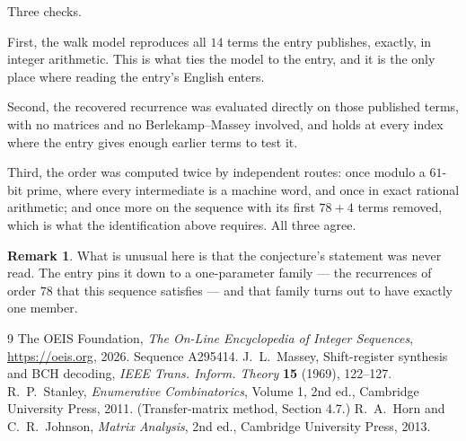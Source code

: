 \documentclass[11pt,a4paper]{article}
\theoremstyle{plain}
\theoremstyle{definition}
\newtheorem{remark}[theorem]{Remark}
\begin{document}
Three checks.

First, the walk model reproduces all $14$ terms the entry publishes, exactly, in integer
arithmetic. This is what ties the model to the entry, and it is the only place where reading
the entry's English enters.

Second, the recovered recurrence was evaluated directly on those published terms, with no
matrices and no Berlekamp--Massey involved, and holds at every index where the entry gives
enough earlier terms to test it.

Third, the order was computed twice by independent routes: once modulo a $61$-bit prime, where
every intermediate is a machine word, and once in exact rational arithmetic; and once more on
the sequence with its first $78+4$ terms removed, which is what the identification above
requires. All three agree.

\begin{remark}
What is unusual here is that the conjecture's statement was never read. The entry pins it down
to a one-parameter family --- the recurrences of order $78$ that this sequence satisfies
--- and that family turns out to have exactly one member.
\end{remark}

\begin{thebibliography}{9}
 The OEIS Foundation, \emph{The On-Line Encyclopedia of Integer
Sequences}, \url{https://oeis.org}, 2026. Sequence A295414.
 J.~L.~Massey, Shift-register synthesis and BCH decoding, \emph{IEEE
Trans. Inform. Theory} \textbf{15} (1969), 122--127.
 R.~P.~Stanley, \emph{Enumerative Combinatorics}, Volume 1, 2nd ed.,
Cambridge University Press, 2011. (Transfer-matrix method, Section 4.7.)
 R.~A.~Horn and C.~R.~Johnson, \emph{Matrix Analysis}, 2nd ed., Cambridge
University Press, 2013.
\end{thebibliography}
\end{document}
